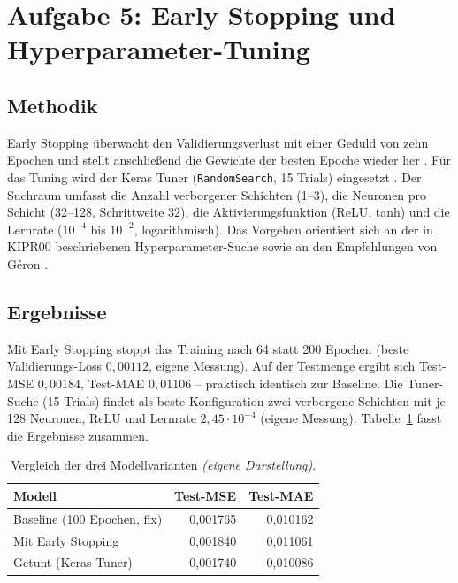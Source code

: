 
\section{Aufgabe 5: Early Stopping und Hyperparameter-Tuning}
\label{sec:aufgabe5}

\subsection{Methodik}

Early Stopping überwacht den Validierungsverlust mit einer Geduld von zehn Epochen und stellt anschließend die Gewichte der besten Epoche wieder her \cite[S.~60]{2}. Für das Tuning wird der Keras Tuner (\texttt{RandomSearch}, 15 Trials) eingesetzt \cite{6}. Der Suchraum umfasst die Anzahl verborgener Schichten (1--3), die Neuronen pro Schicht (32--128, Schrittweite 32), die Aktivierungsfunktion (\ac{ReLU}, tanh) und die Lernrate ($10^{-4}$ bis $10^{-2}$, logarithmisch). Das Vorgehen orientiert sich an der in KIPR00 beschriebenen Hyperparameter-Suche \cite[S.~30--31]{2} sowie an den Empfehlungen von Géron \cite[S.~154--160]{1}.

\subsection{Ergebnisse}

Mit Early Stopping stoppt das Training nach 64 statt 200 Epochen (beste Validierungs-Loss $0{,}00112$, eigene Messung). Auf der Testmenge ergibt sich Test-\ac{MSE} $0{,}00184$, Test-\ac{MAE} $0{,}01106$ -- praktisch identisch zur Baseline. Die Tuner-Suche (15 Trials) findet als beste Konfiguration zwei verborgene Schichten mit je 128 Neuronen, \ac{ReLU} und Lernrate $2{,}45 \cdot 10^{-4}$ (eigene Messung). Tabelle~\ref{tab:a5_vergleich} fasst die Ergebnisse zusammen.

\begin{table}[H]
    \centering
    \begin{tabular}{lrr}
        \toprule
        Modell & Test-\ac{MSE} & Test-\ac{MAE} \\
        \midrule
        Baseline (100 Epochen, fix)       & 0{,}001765 & 0{,}010162 \\
        Mit Early Stopping                & 0{,}001840 & 0{,}011061 \\
        Getunt (Keras Tuner)              & 0{,}001740 & 0{,}010086 \\
        \bottomrule
    \end{tabular}
    \caption{Vergleich der drei Modellvarianten \textit{(eigene Darstellung)}.}
    \label{tab:a5_vergleich}
\end{table}

